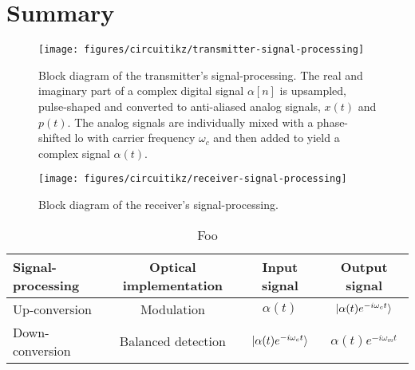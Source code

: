 \section*{Summary}

\begin{figure}[htb]
	\centering
	\texttt{[image: figures/circuitikz/transmitter-signal-processing]}
	\caption{Block diagram of the transmitter's signal-processing. The real and imaginary part of a complex digital signal $\alpha[n]$ is upsampled, pulse-shaped and converted to anti-aliased analog signals, $x(t)$ and $p(t)$. The analog signals are individually mixed with a phase-shifted \gls{lo} with carrier frequency $\omega_c$ and then added to yield a complex signal $\alpha(t)$.}\label{fig:transmitter_signal_processing}
\end{figure}

\begin{figure}[htb]
	\centering
	\texttt{[image: figures/circuitikz/receiver-signal-processing]}
	\caption{Block diagram of the receiver's signal-processing.}\label{fig:receiver_signal_processing}
\end{figure}

\begin{table}[htb]
  \centering
  \begin{tabular}{lccc}
    \toprule
    Signal-processing & Optical implementation & Input signal & Output signal \\
    \midrule
    Up-conversion & Modulation & $\alpha(t)$ & $\lvert\alpha(t)e^{-i\omega_c t}\rangle$ \\
    Down-conversion & Balanced detection & $\lvert\alpha(t)e^{-i\omega_c t}\rangle$ & $\alpha(t)e^{-i\omega_mt}$ \\
    \bottomrule
  \end{tabular}
  \caption{Foo}
\end{table}